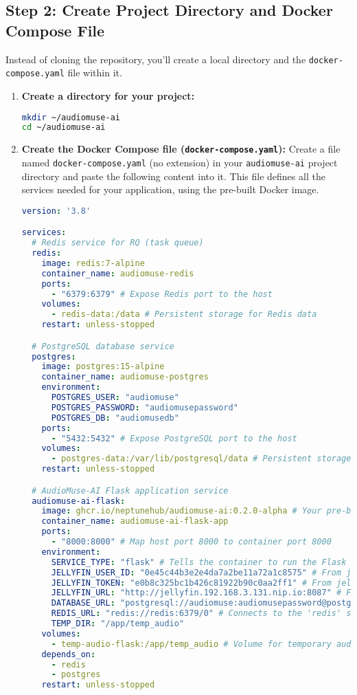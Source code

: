 \documentclass{article}
\begin{document}
\subsection*{Step 2: Create Project Directory and Docker Compose File}

Instead of cloning the repository, you'll create a local directory and the \texttt{docker-compose.yaml} file within it.

\begin{enumerate}
    \item \textbf{Create a directory for your project:}
    \begin{lstlisting}[language=bash, caption=Create project directory]
mkdir ~/audiomuse-ai
cd ~/audiomuse-ai
    \end{lstlisting}

    \item \textbf{Create the Docker Compose file (\texttt{docker-compose.yaml}):}
    Create a file named \texttt{docker-compose.yaml} (no extension) in your \texttt{audiomuse-ai} project directory and paste the following content into it. This file defines all the services needed for your application, using the pre-built Docker image.

    \begin{lstlisting}[language=yaml, caption=docker-compose.yaml]
version: '3.8'

services:
  # Redis service for RQ (task queue)
  redis:
    image: redis:7-alpine
    container_name: audiomuse-redis
    ports:
      - "6379:6379" # Expose Redis port to the host
    volumes:
      - redis-data:/data # Persistent storage for Redis data
    restart: unless-stopped

  # PostgreSQL database service
  postgres:
    image: postgres:15-alpine
    container_name: audiomuse-postgres
    environment:
      POSTGRES_USER: "audiomuse"
      POSTGRES_PASSWORD: "audiomusepassword"
      POSTGRES_DB: "audiomusedb"
    ports:
      - "5432:5432" # Expose PostgreSQL port to the host
    volumes:
      - postgres-data:/var/lib/postgresql/data # Persistent storage for PostgreSQL data
    restart: unless-stopped

  # AudioMuse-AI Flask application service
  audiomuse-ai-flask:
    image: ghcr.io/neptunehub/audiomuse-ai:0.2.0-alpha # Your pre-built image
    container_name: audiomuse-ai-flask-app
    ports:
      - "8000:8000" # Map host port 8000 to container port 8000
    environment:
      SERVICE_TYPE: "flask" # Tells the container to run the Flask app
      JELLYFIN_USER_ID: "0e45c44b3e2e4da7a2be11a72a1c8575" # From jellyfin-credentials secret
      JELLYFIN_TOKEN: "e0b8c325bc1b426c81922b90c0aa2ff1" # From jellyfin-credentials secret
      JELLYFIN_URL: "http://jellyfin.192.168.3.131.nip.io:8087" # From audiomuse-ai-config ConfigMap
      DATABASE_URL: "postgresql://audiomuse:audiomusepassword@postgres:5432/audiomusedb" # Connects to the 'postgres' service
      REDIS_URL: "redis://redis:6379/0" # Connects to the 'redis' service
      TEMP_DIR: "/app/temp_audio"
    volumes:
      - temp-audio-flask:/app/temp_audio # Volume for temporary audio files
    depends_on:
      - redis
      - postgres
    restart: unless-stopped


\end{lstlisting}
\end{enumerate}
\end{document}
